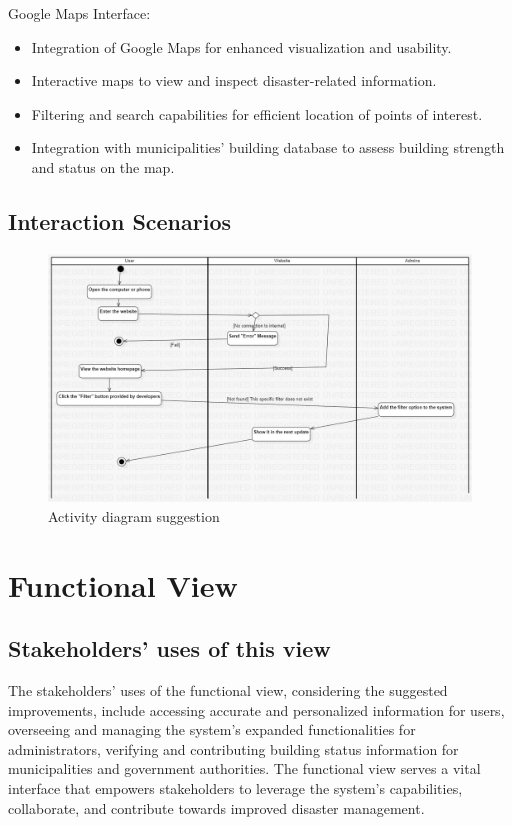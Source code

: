 \documentclass[12pt]{report}
\begin{document}
Google Maps Interface:
\begin{itemize}
    \item Integration of Google Maps for enhanced visualization and usability.
    \item Interactive maps to view and inspect disaster-related information.
    \item Filtering and search capabilities for efficient location of points of interest.
    \item Integration with municipalities' building database to assess building strength and status on the map.
\end{itemize}

\subsection{Interaction Scenarios}
\begin{figure}[H]
    \includegraphics[scale=0.4]{actsuggestion.jpg}
    \centering
    \caption{Activity diagram suggestion}
\end{figure}

\section{Functional View}

\subsection{Stakeholders' uses of this view}
The stakeholders' uses of the functional view, considering the suggested improvements, include accessing accurate and personalized information for 
users, overseeing and managing the system's expanded functionalities for administrators, verifying and contributing building status information for
municipalities and government authorities. The functional view serves a vital interface that empowers stakeholders to leverage the system's capabilities, 
collaborate, and contribute towards improved disaster management.
\end{document}
